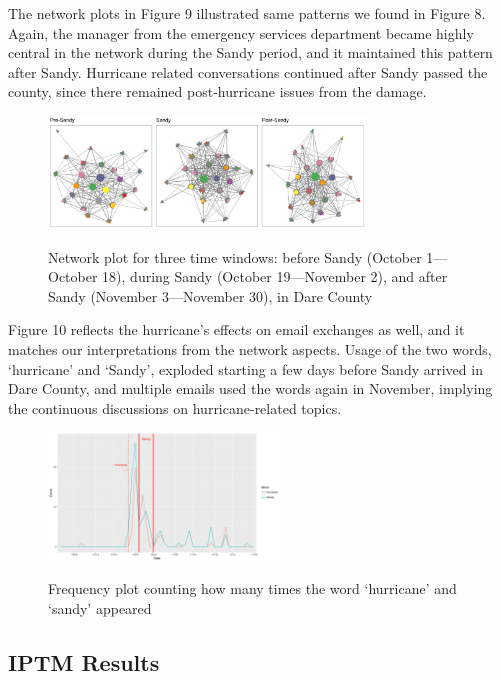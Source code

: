 \documentclass[a4paper]{article}
\begin{document}
    The network plots in Figure 9 illustrated same patterns we found in Figure 8. Again, the manager from the emergency services department became highly central in the network during the Sandy period, and it maintained this pattern after Sandy. Hurricane related conversations continued after Sandy passed the county, since there remained post-hurricane issues from the damage.
         \begin{figure}[ht]
         	\centering
         	\includegraphics[width=0.75\textwidth]{plots/DareNetwork-1.png} 
         	\label{fig:NetworkDare}
         	\caption{Network plot for three time windows: before Sandy (October 1---October 18), during Sandy (October 19---November 2), and after Sandy (November 3---November 30), in Dare County}
         \end{figure}
         
        Figure 10 reflects the hurricane's effects on email exchanges as well, and it matches our interpretations from the network aspects. Usage of the two words, `hurricane' and `Sandy', exploded starting a few days before Sandy arrived in Dare County, and multiple emails used the words again in November, implying the continuous discussions on hurricane-related topics.
            \begin{figure}[ht]
            	\centering
            	\includegraphics[width=0.55\textwidth]{plots/DareWord-1.png}  
            	\label{fig:WordDare}
            	\caption{Frequency plot counting how many times the word `hurricane' and `sandy' appeared}
            \end{figure}
   \subsection{IPTM Results} \label{subsec: IPTM results}
   
\end{document}
